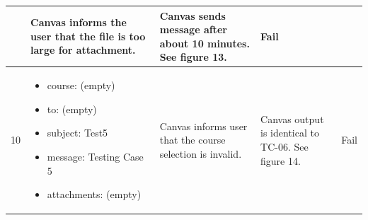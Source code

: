 \documentclass[10pt,letterpaper]{article}
\begin{document}
\begin{table}[h!]
\begin{tabularx}{\textwidth}{lXXXl}
\begin{itemize}
  \end{itemize} &
   Canvas informs the user that the file is too large for attachment. &
   Canvas sends message after about 10 minutes. See figure 13. &
   Fail \\ \midrule
10 &
  \begin{itemize}
    \item{course: (empty)}
    \item{to: (empty)}
    \item{subject: Test5}
    \item{message: Testing Case 5}
    \item{attachments: (empty)}
  \end{itemize} &
   Canvas informs user that the course selection is invalid. &
   Canvas output is identical to TC-06. See figure 14. &
   Fail \\ \bottomrule
\end{tabularx}
\end{table}
\end{document}
